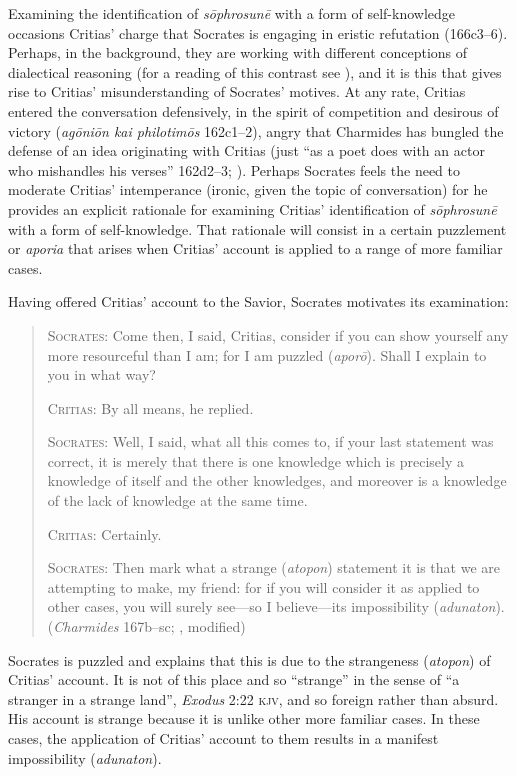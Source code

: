 Examining the identification of \emph{sōphrosunē} with a form of self-knowledge occasions Critias' charge that Socrates is engaging in eristic refutation (166c3–6). Perhaps, in the background, they are working with different conceptions of dialectical reasoning (for a reading of this contrast see \citealt[chapter 4]{Schmid:1998aa}), and it is this that gives rise to Critias' misunderstanding of Socrates' motives. At any rate, Critias entered the conversation defensively, in the spirit of competition and desirous of victory (\emph{agōniōn kai philotimōs} 162c1–2), angry that Charmides has bungled the defense of an idea originating with Critias (just ``as a poet does with an actor who mishandles his verses'' 162d2–3; \citealt[41]{Lamb:1927qw}). Perhaps Socrates feels the need to moderate Critias' intemperance (ironic, given the topic of conversation) for he provides an explicit rationale for examining Critias' identification of \emph{sōphrosunē} with a form of self-knowledge. That rationale will consist in a certain puzzlement or \emph{aporia} that arises when Critias' account is applied to a range of more familiar cases.

Having offered Critias' account to the Savior, Socrates motivates its examination:
\begin{quotation}
	\textsc{Socrates}: Come then, I said, Critias, consider if you can show yourself any more resourceful than I am; for I am puzzled (\emph{aporō}). Shall I explain to you in what way?
	
	\textsc{Critias}: By all means, he replied.
	
	\textsc{Socrates}: Well, I said, what all this comes to, if your last statement was correct, it is merely that there is one knowledge which is precisely a knowledge of itself and the other knowledges, and moreover is a knowledge of the lack of knowledge at the same time.
	
	\textsc{Critias}: Certainly.
	
	\textsc{Socrates}: Then mark what a strange (\emph{atopon}) statement it is that we are attempting to make, my friend: for if you will consider it as applied to other cases, you will surely see—so I believe—its impossibility (\emph{adunaton}). (\emph{Charmides} 167b–sc; \citealt[57]{Lamb:1927qw}, modified)
\end{quotation}

Socrates is puzzled and explains that this is due to the strangeness (\emph{atopon}) of  Critias' account. It is not of this place and so ``strange'' in the sense of ``a stranger in a strange land'', \emph{Exodus} 2:22 \textsc{kjv}, and so foreign rather than absurd. His account is strange because it is unlike other more familiar cases. In these cases, the application of Critias' account to them results in a manifest impossibility (\emph{adunaton}). 

